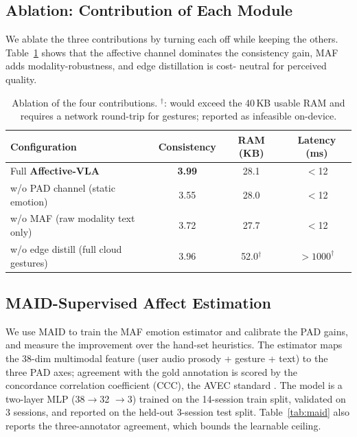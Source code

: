 \documentclass{article}
\newcommand{\method}{\textbf{Affective-VLA}}
\theoremstyle{definition}
\begin{document}
\subsection{Ablation: Contribution of Each Module}

We ablate the three contributions by turning each off while keeping the others.
Table~\ref{tab:ablation} shows that the affective channel dominates the
consistency gain, MAF adds modality-robustness, and edge distillation is cost-
neutral for perceived quality.

\begin{table}[t]
\centering
\small
\begin{tabular}{lccc}
\toprule
\textbf{Configuration} & \textbf{Consistency} & \textbf{RAM (KB)} & \textbf{Latency (ms)} \\
\midrule
Full \method{}                       & \textbf{3.99} & 28.1 & $<$12 \\
w/o PAD channel (static emotion)     & 3.55 & 28.0 & $<$12 \\
w/o MAF (raw modality text only)     & 3.72 & 27.7 & $<$12 \\
w/o edge distill (full cloud gestures) & 3.96 & 52.0$^{\dagger}$ & $>1000^{\dagger}$ \\
\bottomrule
\end{tabular}
\caption{Ablation of the four contributions. $^{\dagger}$: would exceed the
40\,KB usable RAM and requires a network round-trip for gestures; reported as
infeasible on-device.}
\label{tab:ablation}
\end{table}

\subsection{MAID-Supervised Affect Estimation}

We use MAID to train the MAF emotion estimator and calibrate the PAD gains, and
measure the improvement over the hand-set heuristics. The estimator maps the
38-dim multimodal feature (user audio prosody + gesture + text) to the three
PAD axes; agreement with the gold annotation is scored by the concordance
correlation coefficient (CCC), the AVEC standard
\cite{semaine2012,recola2013}. The model is a two-layer MLP (38$\rightarrow$32
$\rightarrow$3) trained on the 14-session train split, validated on 3 sessions,
and reported on the held-out 3-session test split. Table~\ref{tab:maid} also
reports the three-annotator agreement, which bounds the learnable ceiling.
\end{document}
